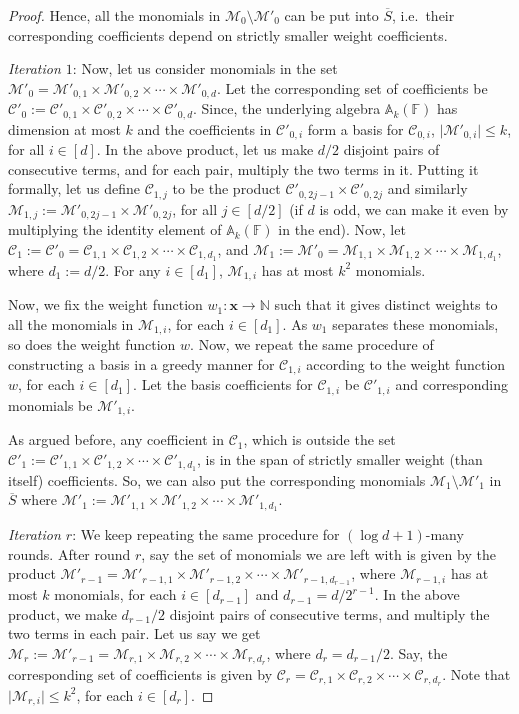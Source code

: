 \documentclass[final,oneeqnum, onethmnum, onefignum]{siamltex1213}
\newcommand{\N}{\mathbb N}
\newcommand{\A}{\mathbb A}
\newcommand{\F}{\mathbb F}
\newcommand{\abs}[1]{\lvert #1 \rvert}
\newcommand{\C}{\mathcal C}
\newcommand{\M}{\mathcal M}
\renewcommand{\o}[1]{\overline{#1}}
\begin{document}
\begin{proof}
Hence, all the monomials in $\M_0 \setminus \M'_0$ can be put
into $\o{S}$, i.e.\ their corresponding coefficients depend
on strictly smaller weight coefficients.

{\em Iteration $1$}: Now, let us consider monomials in the set 
$\M'_0 = \M'_{0,1} \times \M'_{0,2} \times \dotsm  \times \M'_{0,d}$.
Let the corresponding set of coefficients be 
$\C'_0 := \C'_{0,1} \times \C'_{0,2} \times \dotsm \times \C'_{0,d}$.
Since, the underlying algebra $\A_k(\F)$ has dimension at most $k$
and the coefficients
in $\C'_{0,i}$ form a basis for $\C_{0,i}$,
$\abs{\M'_{0,i}} \leq k$, for all $i \in [d]$. 
In the above product, let us make $d/2$ disjoint pairs of consecutive terms,
and for each pair, multiply the two terms in it. 
Putting it formally, 
let us define $\C_{1,j}$ to be the product $\C'_{0,2j-1} \times \C'_{0,2j}$
and similarly $\M_{1,j} := \M'_{0,2j-1} \times \M'_{0,2j}$, for all $j \in [d/2]$ 
(if $d$ is odd, we can make it even by multiplying the identity element of
$\A_k(\F)$ in the end). 
Now, let $\C_1 := \C'_0 = \C_{1,1} \times \C_{1,2} \times \dotsm \times \C_{1,d_1}$, 
and $\M_1 := \M'_0 = \M_{1,1} \times \M_{1,2} \times \dotsm  \times \M_{1,d_1}$,
where $d_1 := d/2$. 
For any $i \in [d_1]$, $\M_{1,i}$ has at most $k^2$ monomials. 

Now, we fix the weight function $w_1 \colon \mathbf{x} \to \N$ such that
it gives distinct weights to all the monomials in $\M_{1,i}$, for each $i \in [d_1]$. 
As $w_1$ separates these monomials, so does the weight function $w$.
Now, we repeat the same procedure of constructing a 
basis in a greedy manner for $\C_{1,i}$ according to the weight
function $w$, for each $i \in [d_1]$.
Let the basis coefficients for $\C_{1,i}$
be $\C'_{1,i}$ and corresponding monomials be $\M'_{1,i}$. 

As argued before, any coefficient in $\C_1$, 
which is outside the set 
$\C'_1 := \C'_{1,1} \times \C'_{1,2} \times \dotsm \times \C'_{1,d_1}$,
is in the span of strictly smaller weight (than itself) coefficients. 
So, we can also put the corresponding monomials 
$\M_1 \setminus \M'_1$ in $\o{S}$
where $\M'_1 := \M'_{1,1} \times \M'_{1,2} \times \dotsm  \times \M'_{1,d_1}$.

{\em Iteration $r$}: We keep repeating the same procedure for $(\log d +1)$-many rounds.
After round $r$, say the set of monomials we are left with is given by
the product
$\M'_{r-1} = \M'_{r-1,1} \times \M'_{r-1,2} \times \dotsm \times \M'_{r-1,d_{r-1}}$,
where $\M_{r-1,i}$ has at most $k$ monomials, for each $i \in [d_{r-1}]$ 
and $d_{r-1} = d / 2^{r-1}$.
In the above product, 
we make $d_{r-1}/2$ disjoint pairs of consecutive terms, 
and multiply the two terms in each pair.
Let us say we get $\M_r := \M'_{r-1}= 
\M_{r,1} \times \M_{r,2} \times \dotsm \times \M_{r,d_r}$,
where $d_r = d_{r-1}/2$.
Say, the corresponding set of coefficients is given by
$\C_r = \C_{r,1} \times \C_{r,2} \times \dotsm \times \C_{r,d_r}$.
Note that $\abs{\M_{r,i}} \leq k^2$, for each $i \in [d_r]$.


\end{proof}
\end{document}
